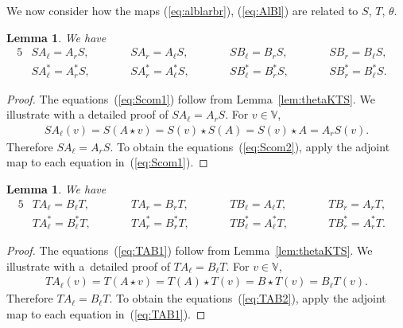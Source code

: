 \documentclass[11pt]{article}
\numberwithin{equation}{section}
\numberwithin{equation}{section}
\newtheorem{Lemma}[Theorem]{Lemma}
\begin{document}
{We now consider how the maps (\ref{eq:alblarbr}), (\ref{eq:AlBl}) are related to $S$, $T$, $\theta$.
\begin{Lemma}\label{lem:SAB}
We have
\begin{alignat}{5}
& S A_\ell = A_r S, \qquad&&
 S A_r = A_\ell S, \qquad&&
 S B_\ell = B_r S, \qquad&&
 S B_r = B_\ell S,&\label{eq:Scom1}\\
& S A^*_\ell = A^*_r S, \qquad &&
 S A^*_r = A^*_\ell S, \qquad &&
 S B^*_\ell = B^*_r S, \qquad &&
 S B^*_r = B^*_\ell S.&\label{eq:Scom2}
\end{alignat}
\end{Lemma}
\begin{proof} The equations~(\ref{eq:Scom1}) follow from Lemma~\ref{lem:thetaKTS}. We illustrate with a detailed proof of
$S A_{\ell} = A_r S$. For $v \in \mathbb V$,
\begin{gather*}
S A_{\ell}(v) = S(A \star v) = S(v)\star S(A) = S(v) \star A = A_r S(v).
\end{gather*}
Therefore $S A_{\ell} = A_r S$. To obtain the equations~(\ref{eq:Scom2}), apply the adjoint map to each equation in~(\ref{eq:Scom1}).
\end{proof}

\begin{Lemma}\label{lem:TAB} We have
\begin{alignat}{5}
\label{eq:TAB1}
& T A_\ell = B_\ell T, \qquad &&
 T A_r = B_r T, \qquad &&
 T B_\ell = A_\ell T, \qquad &&
 T B_r = A_r T,&\\
\label{eq:TAB2}
& T A^*_\ell = B^*_\ell T, \qquad &&
 T A^*_r = B^*_r T, \qquad &&
 T B^*_\ell = A^*_\ell T, \qquad &&
 T B^*_r = A^*_r T.
\end{alignat}
\end{Lemma}
\begin{proof} The equations~(\ref{eq:TAB1}) follow from Lemma~\ref{lem:thetaKTS}. We illustrate with a~detailed proof of $T A_\ell = B_\ell T$. For $v \in \mathbb V$,
\begin{gather*}
T A_\ell (v) =
T(A \star v) =
T(A) \star T(v) =
B \star T(v) =
B_\ell T (v).
\end{gather*}
Therefore
$T A_\ell = B_\ell T$. To obtain the equations~(\ref{eq:TAB2}), apply the adjoint map to each equation in~(\ref{eq:TAB1}).
\end{proof}

}
\end{document}
